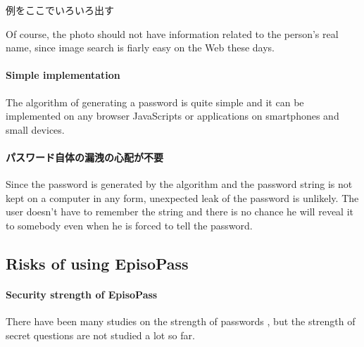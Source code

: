 \documentclass{article}
\begin{document}
例をここでいろいろ出す


Of course, the photo should not have information related to the
person's real name, since image search is fiarly easy on the Web these days.

\paragraph{Simple implementation}

The algorithm of generating a password is quite simple and
it can be implemented on any browser JavaScripts or
applications on smartphones and small devices.

\paragraph{パスワード自体の漏洩の心配が不要}

Since the password is generated by the algorithm and the password
string is not kept on a computer in any form,
unexpected leak of the password is unlikely.
The user doesn't have to remember the string and
there is no chance he will reveal it to somebody
even when he is forced to tell the password.


\subsection{Risks of using EpisoPass}

\paragraph{Security strength of EpisoPass}


There have been many studies on the strength of passwords
\cite{Hayashi:2011:DSP:1978942.1979326}%
\cite{Komanduri:2011:PPM:1978942.1979321},%
but the strength of secret questions are not studied a lot so far.
\end{document}
